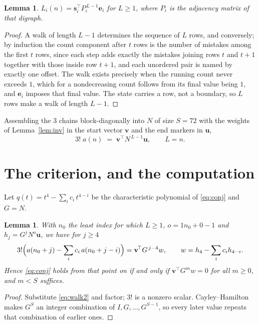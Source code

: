 \documentclass[11pt,a4paper]{article}
\theoremstyle{plain}
\newtheorem{lemma}[theorem]{Lemma}
\theoremstyle{definition}
\begin{document}
\begin{lemma}\label{lem:walk}
$L_i(n)=\mathbf{s}_i^{\!\top}P_i^{\,L-1}\mathbf{e}_i$ for $L\ge1$, where $P_i$ is the
adjacency matrix of that digraph.
\end{lemma}

\begin{proof}
A walk of length $L-1$ determines the sequence of $L$ rows, and conversely; by induction
the count component after $t$ rows is the number of mistakes among the first $t$ rows,
since each step adds exactly the mistakes joining rows $t$ and $t+1$ together with those
inside row $t+1$, and each unordered pair is named by exactly one offset. The walk exists
precisely when the running count never exceeds $1$, which for a nondecreasing count follows
from its final value being $1$, and $\mathbf{e}_i$ imposes that final value. The state
carries a row, not a boundary, so $L$ rows make a walk of length $L-1$.
\end{proof}

Assembling the $3$ chains block-diagonally into $N$ of size $S=72$ with the weights of
Lemma~\ref{lem:inv} in the start vector $\mathbf{v}$ and the end markers in
$\mathbf{u}$,
\begin{equation}\label{eq:walk2}
3!\;a(n)\;=\;\mathbf{v}^{\!\top}N^{\,L-1}\mathbf{u},\qquad L=n .
\end{equation}

\section{The criterion, and the computation}

Let $q(t)=t^{4}-\sum_i c_i\,t^{4-i}$ be the characteristic polynomial of
\eqref{eq:conj} and $G=N$.

\begin{lemma}\label{lem:crit}
With $n_0$ the least index for which $L\ge1$, $o=1n_0+0-1$ and
$h_j=G^{j}N^{o}\mathbf{u}$, we have for $j\ge4$
\[
3!\Bigl(a(n_0+j)-\sum_i c_i\,a(n_0+j-i)\Bigr)=\mathbf{v}^{\!\top}G^{\,j-4}w,
\qquad w=h_{4}-\sum_i c_ih_{4-i} .
\]
Hence \eqref{eq:conj} holds from that point on if and only if
$\mathbf{v}^{\!\top}G^{m}w=0$ for all $m\ge0$, and $m<S$ suffices.
\end{lemma}

\begin{proof}
Substitute \eqref{eq:walk2} and factor; $3!$ is a nonzero scalar. Cayley--Hamilton
makes $G^{S}$ an integer combination of $I,G,\dots,G^{S-1}$, so every later value repeats
that combination of earlier ones.
\end{proof}
\end{document}
